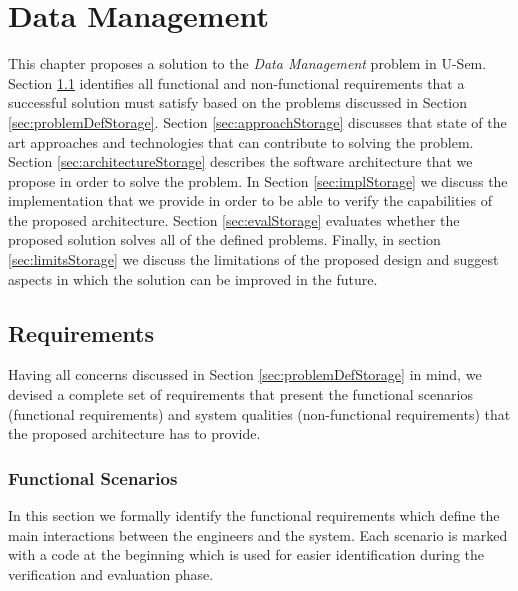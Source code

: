 \chapter{Data Management} 
\label{cha:data}

This chapter proposes a solution to the \textit{Data Management} problem in U-Sem. Section \ref{sec:storageReq} identifies all functional and non-functional requirements that a successful solution must satisfy based on the problems discussed in Section \ref{sec:problemDefStorage}. Section \ref{sec:approachStorage} discusses that state of the art approaches and technologies that  can contribute to solving the problem. Section \ref{sec:architectureStorage} describes the software architecture that we propose in order to solve the problem. In Section \ref{sec:implStorage} we discuss the implementation that we provide in order to be able to verify the capabilities of the proposed architecture. Section \ref{sec:evalStorage} evaluates whether the proposed solution solves all of the defined problems. Finally, in section \ref{sec:limitsStorage} we discuss the limitations of the proposed design and suggest aspects in which the solution can be improved in the future.

\section{Requirements}
\label{sec:storageReq}

Having all concerns discussed in Section \ref{sec:problemDefStorage} in mind, we devised a complete set of requirements that present the functional scenarios (functional requirements) and system qualities (non-functional requirements) that the proposed architecture has to provide.

\subsection{Functional Scenarios}
In this section we formally identify the functional requirements which define the main interactions between the engineers and the system. Each scenario is marked with a code at the beginning which is used for easier identification during the verification and evaluation phase.

